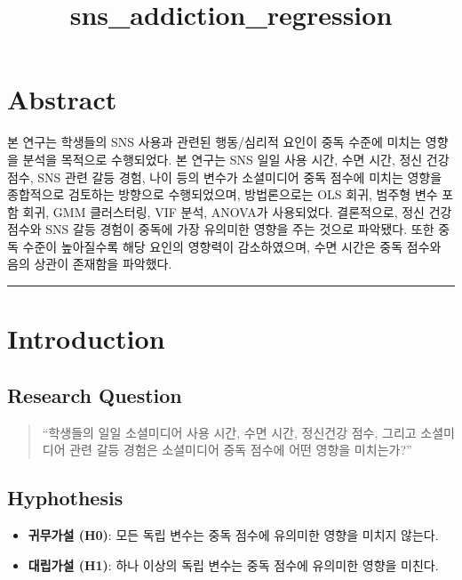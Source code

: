 \documentclass[11pt]{article}
\title{sns\_addiction\_regression}
\providecommand{\tightlist}{%
      \setlength{\itemsep}{0pt}\setlength{\parskip}{0pt}}
\begin{document}
    
    \maketitle
    
    

    
    \section{Abstract}\label{abstract}

본 연구는 학생들의 SNS 사용과 관련된 행동/심리적 요인이 중독 수준에
미치는 영향을 분석을 목적으로 수행되었다. 본 연구는 SNS 일일 사용 시간,
수면 시간, 정신 건강 점수, SNS 관련 갈등 경험, 나이 등의 변수가
소셜미디어 중독 점수에 미치는 영향을 종합적으로 검토하는 방향으로
수행되었으며, 방법론으로는 OLS 회귀, 범주형 변수 포함 회귀, GMM
클러스터링, VIF 분석, ANOVA가 사용되었다. 결론적으로, 정신 건강 점수와
SNS 갈등 경험이 중독에 가장 유의미한 영향을 주는 것으로 파악됐다. 또한
중독 수준이 높아질수록 해당 요인의 영향력이 감소하였으며, 수면 시간은
중독 점수와 음의 상관이 존재함을 파악했다.

    \begin{center}\rule{0.5\linewidth}{0.5pt}\end{center}

\section{Introduction}\label{introduction}

\subsection{Research Question}\label{research-question}

\begin{quote}
``학생들의 일일 소셜미디어 사용 시간, 수면 시간, 정신건강 점수, 그리고
소셜미디어 관련 갈등 경험은 소셜미디어 중독 점수에 어떤 영향을
미치는가?''
\end{quote}

\subsection{Hyphothesis}\label{hyphothesis}

\begin{itemize}
\tightlist
\item
  \textbf{귀무가설 (H0)}: 모든 독립 변수는 중독 점수에 유의미한 영향을
  미치지 않는다.
\item
  \textbf{대립가설 (H1)}: 하나 이상의 독립 변수는 중독 점수에 유의미한
  영향을 미친다.
\end{itemize}
\end{document}
